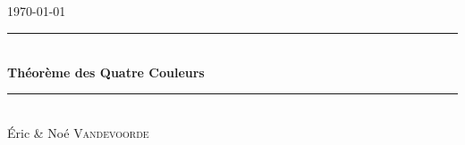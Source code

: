 \begin{titlepage}
\begin{center}
\textit{}\vfill

\textit{}\\\textit{}\\\textit{}\\\textit{}\\
\today\\[0.8cm]

\rule{\linewidth}{.5pt}\\[1.0cm]

{ \Huge \bfseries Théorème des Quatre Couleurs}\\[0.8cm]

\rule{\linewidth}{.5pt} \\[1.2cm]

\LARGE{Éric \& Noé \textsc{Vandevoorde}}\\

\vfill\textit{}
\end{center}
\end{titlepage}